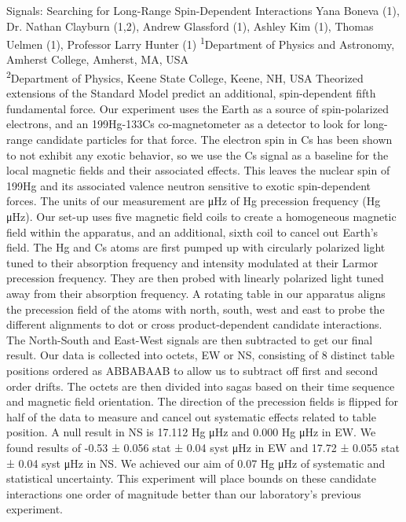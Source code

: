 \makeabstract
{
Signals: Searching for Long-Range Spin-Dependent Interactions
}
{
Yana Boneva (1), Dr. Nathan Clayburn (1,2), Andrew Glassford (1), Ashley Kim (1), Thomas Uelmen (1), Professor Larry Hunter (1)
}
{
\textsuperscript{1}Department of Physics and Astronomy, Amherst College, Amherst, MA, USA\\
\textsuperscript{2}Department of Physics, Keene State College, Keene, NH, USA
}
{
Theorized extensions of the Standard Model predict an additional, spin-dependent fifth fundamental force. Our experiment uses the Earth as a source of spin-polarized electrons, and an 199Hg-133Cs co-magnetometer as a detector to look for long-range candidate particles for that force. The electron spin in Cs has been shown to not exhibit any exotic behavior, so we use the Cs signal as a baseline for the local magnetic fields and their associated effects. This leaves the nuclear spin of 199Hg and its associated valence neutron sensitive to exotic spin-dependent forces. The units of our measurement are μHz of Hg precession frequency (Hg μHz).
}
{
Our set-up uses five magnetic field coils to create a homogeneous magnetic field within the apparatus, and an additional, sixth coil to cancel out Earth’s field. The Hg and Cs atoms are first pumped up with circularly polarized light tuned to their absorption frequency and intensity modulated at their Larmor precession frequency. They are then probed with linearly polarized light tuned away from their absorption frequency. A rotating table in our apparatus aligns the precession field of the atoms with north, south, west and east to probe the different alignments to dot or cross product-dependent candidate interactions. The North-South and East-West signals are then subtracted to get our final result. Our data is collected into octets, EW or NS, consisting of 8 distinct table positions ordered as ABBABAAB to allow us to subtract off first and second order drifts. The octets are then divided into sagas based on their time sequence and magnetic field orientation. The direction of the precession fields is flipped for half of the data to measure and cancel out systematic effects related to table position.
}
{
A null result in NS is 17.112 Hg μHz and 0.000 Hg μHz in EW. We found results of -0.53 ± 0.056 stat  ± 0.04 syst μHz in EW and 17.72 ± 0.055 stat  ± 0.04 syst μHz in NS.
}
{
We achieved our aim of 0.07 Hg μHz of systematic and statistical uncertainty. This experiment will place bounds on these candidate interactions one order of magnitude better than our laboratory’s previous experiment.
}

\newpage
